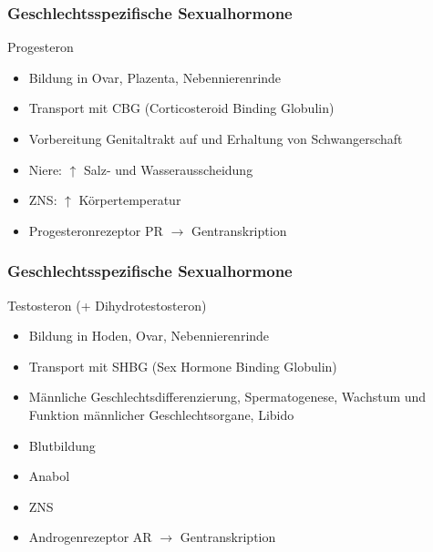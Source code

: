 \documentclass{beamer}
\begin{document}
\begin{frame}
\frametitle{Geschlechtsspezifische Sexualhormone}

\begin{block}{Progesteron}
\begin{itemize}
\item
Bildung in Ovar, Plazenta, Nebennierenrinde
\item
Transport mit CBG (Corticosteroid Binding Globulin)
\item
Vorbereitung Genitaltrakt auf und Erhaltung von Schwangerschaft
\item
Niere: \(\uparrow\) Salz- und Wasserausscheidung
\item
ZNS: \(\uparrow\) Körpertemperatur
\item
Progesteronrezeptor PR \(\rightarrow\) Gentranskription
\end{itemize}
\end{block}

\end{frame}

\begin{frame}
 \frametitle{Geschlechtsspezifische Sexualhormone}



\begin{block}{Testosteron (+ Dihydrotestosteron)}
\begin{itemize}
\item
Bildung in Hoden, Ovar, Nebennierenrinde
\item
Transport mit SHBG (Sex Hormone Binding Globulin)
\item
 Männliche Geschlechtsdifferenzierung, Spermatogenese, Wachstum und Funktion männlicher Geschlechtsorgane, Libido
\item
Blutbildung
\item
Anabol
\item
ZNS
\item
 Androgenrezeptor AR \(\rightarrow\) Gentranskription
\end{itemize}
\end{block}
\end{frame}
\end{document}
